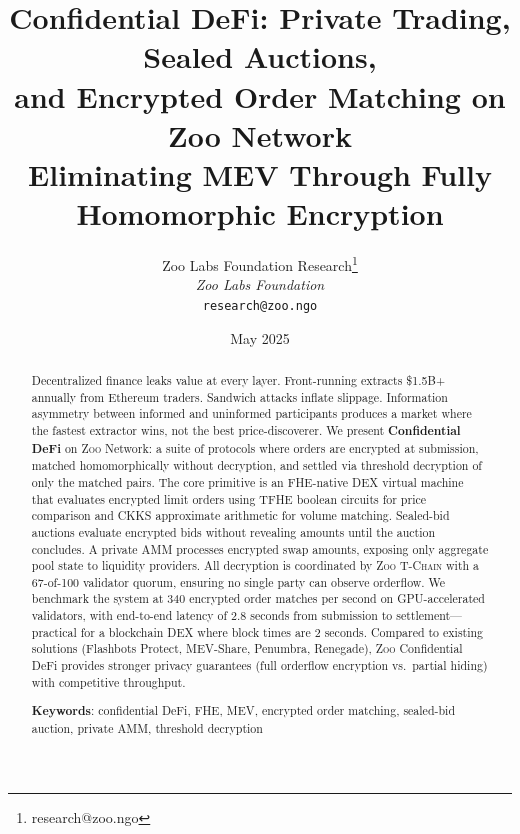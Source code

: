 \documentclass[11pt,letterpaper]{article}
\title{\textbf{Confidential DeFi: Private Trading, Sealed Auctions,\\and Encrypted Order Matching on Zoo Network}\\
\large Eliminating MEV Through Fully Homomorphic Encryption}
\author{
Zoo Labs Foundation Research\thanks{research@zoo.ngo}\\
\textit{Zoo Labs Foundation}\\
\texttt{research@zoo.ngo}
}
\date{May 2025}
\theoremstyle{definition}
\theoremstyle{remark}
\newcommand{\Zoo}{\textsc{Zoo}}
\newcommand{\TChain}{\textsc{T-Chain}}
\newcommand{\TFHE}{\textsc{TFHE}}
\newcommand{\CKKS}{\textsc{CKKS}}
\newcommand{\FHE}{\textsc{FHE}}
\newcommand{\AMM}{\textsc{AMM}}
\newcommand{\DEX}{\textsc{DEX}}
\begin{document}
\zoocoverpage

\begin{abstract}
Decentralized finance leaks value at every layer. Front-running extracts \$1.5B+ annually from Ethereum traders. Sandwich attacks inflate slippage. Information asymmetry between informed and uninformed participants produces a market where the fastest extractor wins, not the best price-discoverer. We present \textbf{Confidential DeFi} on \Zoo{} Network: a suite of protocols where orders are encrypted at submission, matched homomorphically without decryption, and settled via threshold decryption of only the matched pairs. The core primitive is an \FHE{}-native \DEX{} virtual machine that evaluates encrypted limit orders using \TFHE{} boolean circuits for price comparison and \CKKS{} approximate arithmetic for volume matching. Sealed-bid auctions evaluate encrypted bids without revealing amounts until the auction concludes. A private \AMM{} processes encrypted swap amounts, exposing only aggregate pool state to liquidity providers. All decryption is coordinated by \Zoo{} \TChain{} with a 67-of-100 validator quorum, ensuring no single party can observe orderflow. We benchmark the system at 340 encrypted order matches per second on GPU-accelerated validators, with end-to-end latency of 2.8 seconds from submission to settlement---practical for a blockchain \DEX{} where block times are 2 seconds. Compared to existing solutions (Flashbots Protect, MEV-Share, Penumbra, Renegade), \Zoo{} Confidential DeFi provides stronger privacy guarantees (full orderflow encryption vs.\ partial hiding) with competitive throughput.

\textbf{Keywords}: confidential DeFi, FHE, MEV, encrypted order matching, sealed-bid auction, private AMM, threshold decryption
\end{abstract}

\tableofcontents
\newpage













\end{document}

